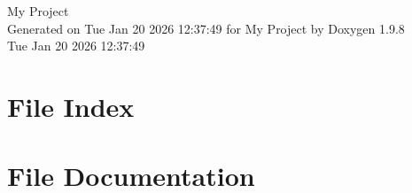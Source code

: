 \documentclass[twoside]{book}
\newcommand{\+}{\discretionary{\mbox{\scriptsize$\hookleftarrow$}}{}{}}
\newcommand{\clearemptydoublepage}{%
    \newpage{\pagestyle{empty}\cleardoublepage}%
  }
\begin{document}
  \raggedbottom
    \hypersetup{pageanchor=false,
                bookmarksnumbered=true,
                pdfencoding=unicode
               }
  \begin{titlepage}
  \vspace*{7cm}
  \begin{center}%
  {\Large My Project}\\
  \vspace*{1cm}
  {\large Generated on Tue Jan 20 2026 12\+:37\+:49 for My Project by Doxygen 1.9.8}\\
    \vspace*{0.5cm}
    {\small Tue Jan 20 2026 12:37:49}
  \end{center}
  \end{titlepage}
  \clearemptydoublepage
  \tableofcontents
  \clearemptydoublepage
  \hypersetup{pageanchor=true}

\chapter{File Index}

\chapter{File Documentation}


  \backmatter
  \newpage
  \clearemptydoublepage
  \printindex
\end{document}
